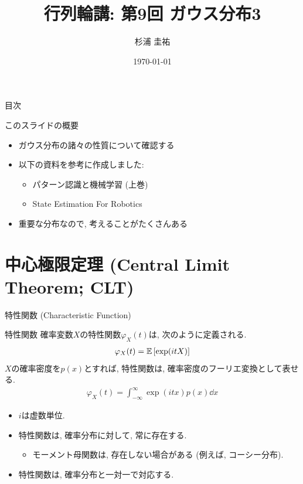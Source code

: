 \documentclass[dvipdfmx,notheorems,t]{beamer}
\title{行列輪講: 第9回 ガウス分布3}
\author{杉浦 圭祐}
\institute[松谷研究室]{慶應義塾大学理工学部情報工学科 松谷研究室}
\date{\today}
\begin{document}
\linespread{1.1}

\frame{\titlepage}

\section{}

\begin{frame}{目次}
\tableofcontents
\end{frame}

\begin{frame}{このスライドの概要}
\begin{itemize}
  \item ガウス分布の諸々の性質について確認する
  \item 以下の資料を参考に作成しました:
  \begin{itemize}
    \item パターン認識と機械学習 (上巻)
    \item State Estimation For Robotics
  \end{itemize}
  \item 重要な分布なので, 考えることがたくさんある
\end{itemize}
\end{frame}

\section{中心極限定理 (Central Limit Theorem; CLT)}

\begin{frame}{特性関数 (Characteristic Function)}
\begin{block}{特性関数}
  確率変数$X$の特性関数$\varphi_X(t)$は, 次のように定義される.
  \begin{align*}
    \varphi_X(t) = \operatorname{\mathbb{E}} \left[ \exp(itX) \right]
  \end{align*}
  $X$の確率密度を$p(x)$とすれば, 特性関数は, 確率密度のフーリエ変換として表せる.
  \begin{align*}
    \varphi_X(t) = \int_{-\infty}^\infty \exp(itx) p(x) \dd{x}
  \end{align*}
\end{block}

\begin{itemize}
  \item $i$は虚数単位.
  \item 特性関数は, 確率分布に対して, 常に存在する.
  \begin{itemize}
    \item モーメント母関数は, 存在しない場合がある (例えば, コーシー分布).
  \end{itemize}
  \item 特性関数は, 確率分布と一対一で対応する.
\end{itemize}
\end{frame}
\end{document}
